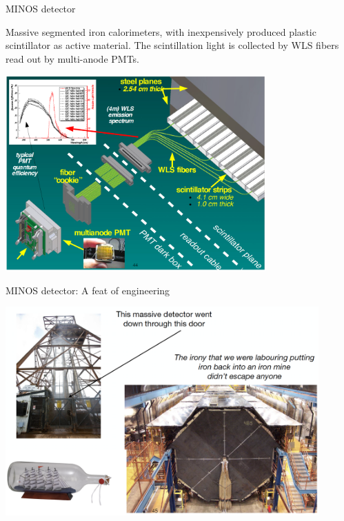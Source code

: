 \begin{frame}[t]{MINOS detector}

  {\scriptsize
   Massive segmented iron calorimeters, with inexpensively produced plastic scintillator
   as active material. The scintillation light is collected by WLS fibers read out by
   multi-anode PMTs.\\
  }
  \begin{center}
  \includegraphics[width=0.75\textwidth]{./images/3nu/accelerator/minos_detector_02.png}\\
  \end{center}
\end{frame}

\begin{frame}[t]{MINOS detector: A feat of engineering}
  \begin{center}
  \includegraphics[width=0.90\textwidth]{./images/3nu/accelerator/minos_detector_03.png}\\
  \end{center}
\end{frame}


